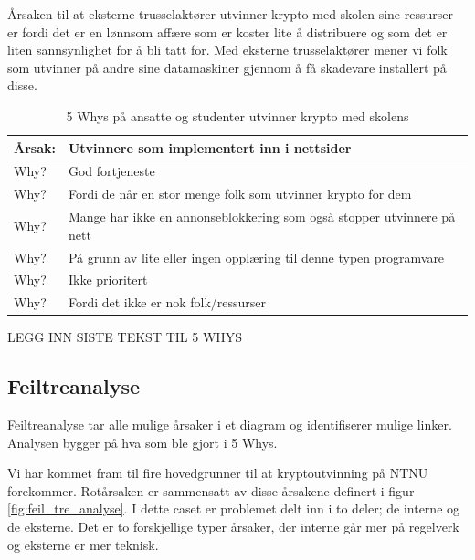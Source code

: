 Årsaken til at eksterne trusselaktører utvinner krypto med skolen sine ressurser er fordi det er en lønnsom affære som er koster lite å distribuere og som det er liten sannsynlighet for å bli tatt for. Med eksterne trusselaktører mener vi folk som utvinner på andre sine datamaskiner gjennom å få skadevare installert på disse.

\begin{table} [H]
    \centering
    \begin{tabular}{ | m{5em} | m{30em} | }
        \hline
            \cellcolor{yellow} Årsak: & \cellcolor{yellow} Utvinnere som implementert inn i nettsider              \\
        \hline
            Why? & God fortjeneste                                   \\
        \hline
            Why? & Fordi de når en stor menge folk som utvinner krypto for dem                                           \\
        \hline
            Why? & Mange har ikke en annonseblokkering som også stopper utvinnere på nett               \\
        \hline
            Why? & På grunn av lite eller ingen opplæring til denne typen programvare           \\
        \hline
            Why? & Ikke prioritert    \\
        \hline
            Why? & Fordi det ikke er nok folk/ressurser    \\
        \hline
    \end{tabular}
    \caption[5 Whys: Minere som er implementert inn i nettsider]{5 Whys på ansatte og studenter utvinner krypto med skolens}
    \label{5Whys-minere}
\end{table}

LEGG INN SISTE TEKST TIL 5 WHYS

\subsection{Feiltreanalyse}
Feiltreanalyse tar alle mulige årsaker i et diagram og identifiserer mulige linker. Analysen bygger på hva som ble gjort i 5 Whys.

Vi har kommet fram til fire hovedgrunner til at kryptoutvinning på NTNU forekommer. Rotårsaken er sammensatt av disse årsakene definert i figur \ref{fig:feil_tre_analyse}. I dette caset er problemet delt inn i to deler; de interne og de eksterne. Det er to forskjellige typer årsaker, der interne går mer på regelverk og eksterne er mer teknisk.          

